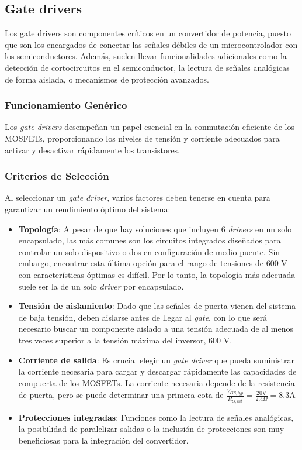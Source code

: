\subsection{Gate drivers}

Los gate drivers son componentes críticos en un convertidor de potencia, puesto que son los encargados de conectar las señales débiles de un microcontrolador con los semiconductores. Además, suelen llevar funcionalidades adicionales como la detección de cortocircuitos en el semiconductor, la lectura de señales analógicas de forma aislada, o mecanismos de protección avanzados.

\subsubsection{Funcionamiento Genérico}

Los \textit{gate drivers} desempeñan un papel esencial en la conmutación eficiente de los MOSFETs, proporcionando los niveles de tensión y corriente adecuados para activar y desactivar rápidamente los transistores. 

\subsubsection{Criterios de Selección}

Al seleccionar un \textit{gate driver}, varios factores deben tenerse en cuenta para garantizar un rendimiento óptimo del sistema:

\begin{itemize}
	\item \textbf{Topología}: A pesar de que hay soluciones que incluyen 6 \textit{drivers} en un solo encapsulado, las más comunes son los circuitos integrados diseñados para controlar un solo dispositivo o dos en configuración de medio puente. Sin embargo, encontrar esta última opción para el rango de tensiones de 600 V con características óptimas es difícil. Por lo tanto, la topología más adecuada suele ser la de un solo \textit{driver} por encapsulado.
	\item \textbf{Tensión de aislamiento}: Dado que las señales de puerta vienen del sistema de baja tensión, deben aislarse antes de llegar al \textit{gate}, con lo que será necesario buscar un componente aislado a una tensión adecuada de al menos tres veces superior a la tensión máxima del inversor, 600 V. 
	\item \textbf{Corriente de salida}: Es crucial elegir un \textit{gate driver} que pueda suministrar la corriente necesaria para cargar y descargar rápidamente las capacidades de compuerta de los MOSFETs. La corriente necesaria depende de la resistencia de puerta, pero se puede determinar una primera cota de $\frac{V_{GS,typ}}{R_{G,int}} = \frac{20 \text{V}}{2.4 \Omega} = 8.3 \text{A}$
	\item \textbf{Protecciones integradas}: Funciones como la lectura de señales analógicas, la posibilidad de paralelizar salidas o la inclusión de protecciones son muy beneficiosas para la integración del convertidor.
\end{itemize}


